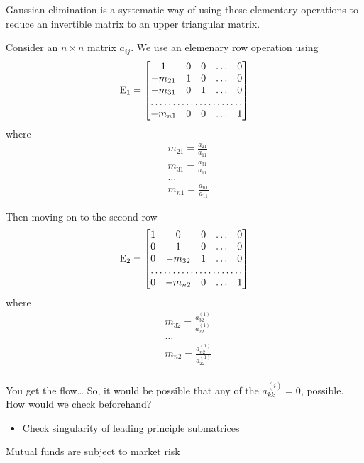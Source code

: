 \documentclass[a4paper]{article}
\begin{document}
Gaussian elimination is a systematic way of using these elementary
operations to reduce an invertible matrix to an upper triangular
matrix.

Consider an $n\times n$ matrix $a_{ij}$. We use an elemenary row operation using
\begin{equation}
	\mathrm{E_1} = \begin{bmatrix} 1 & 0 & 0 &\ldots&0\\
		-m_{21} & 1 & 0  & \ldots & 0\\
-m_{31} & 0 & 1 & \ldots & 0 \\
\hdotsfor{5}\\
-m_{n 1} & 0 & 0 & \ldots & 1\end{bmatrix} 
\end{equation}
where 
\begin{equation}
	\begin{split}
		&m_{21} = \frac{a_{21}}{a_{11}} \\
		&m_{31} = \frac{a_{31}}{a_{11}}\\
		&\ldots\\
		&m_{n 1} = \frac{a_{n 1}}{a_{11}}
	\end{split}
\end{equation}

Then moving on to the second row
\begin{equation}
	\mathrm{E_2} = \begin{bmatrix} 1 & 0 & 0 & \ldots & 0\\
	0 & 1 & 0 & \ldots & 0\\
	0 & -m_{32} & 1 & \ldots & 0\\
	\hdotsfor{5}\\
0 & -m_{n 2} & 0 & \ldots & 1\end{bmatrix} 
\end{equation}
where
\begin{equation}
\begin{split}
	& m_{32} = \frac{a_{32}^{(1)}}{a_{22}^{(1)}}\\
	& \ldots\\
	& m_{n 2} = \frac{a_{n 2}^{(1)}}{a_{22}^{(1)}}\\
\end{split}
\end{equation}

You get the flow\ldots
So, it would be possible that any of the $a_{kk}^{(i)} = 0$, possible.
How would we check beforehand?
\begin{itemize}
	\item Check singularity of leading principle submatrices
\end{itemize}

Mutual funds are subject to market risk
\end{document}
